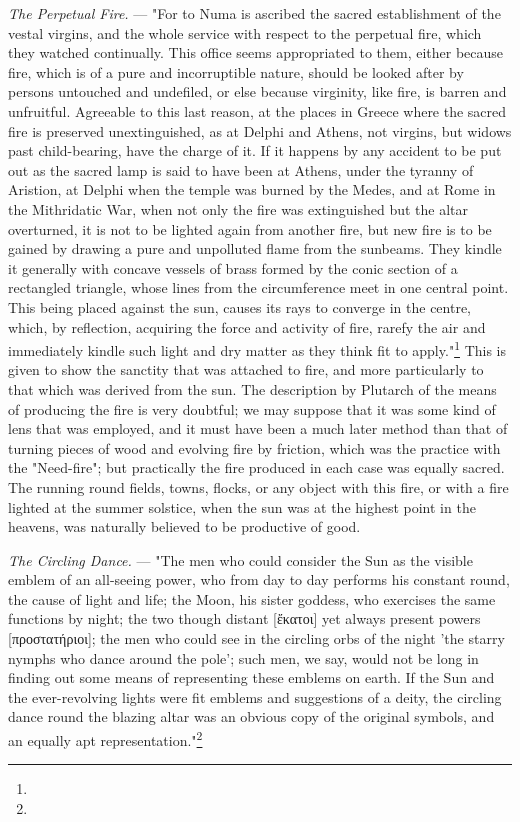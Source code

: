 \documentclass[a4paper, 11pt, oneside, polutonikogreek, english]{article}
\begin{document}
\emph{The Perpetual Fire.} --- "For to Numa is ascribed the sacred establishment of the vestal virgins, and the whole service with respect to the perpetual fire, which they watched continually. This office seems appropriated to them, either because fire, which is of a pure and incorruptible nature, should be looked after by persons untouched and undefiled, or else because virginity, like fire, is barren and unfruitful. Agreeable to this last reason, at the places in Greece where the sacred fire is preserved unextinguished, as at Delphi and Athens, not virgins, but widows past child-bearing, have the charge of it. If it happens by any accident to be put out as the sacred lamp is said to have been at Athens, under the tyranny of Aristion, at Delphi when the temple was burned by the Medes, and at Rome in the Mithridatic War, when not only the fire was extinguished but the altar overturned, it is not to be lighted again from another fire, but new fire is to be gained by drawing a pure and unpolluted flame from the sunbeams. They kindle it generally with concave vessels of brass formed by the conic section of a rectangled triangle, whose lines from the circumference meet in one central point. This being placed against the sun, causes its rays to converge in the centre, which, by reflection, acquiring the force and activity of fire, rarefy the air and immediately kindle such light and dry matter as they think fit to apply."\footnote{} This is given to show the sanctity that was attached to fire, and more particularly to that which was derived from the sun. The description by Plutarch of the means of producing the fire is very doubtful; we may suppose that it was some kind of lens that was employed, and it must have been a much later method than that of turning pieces of wood and evolving fire by friction, which was the practice with the "Need-fire"; but practically the fire produced in each case was equally sacred. The running round fields, towns, flocks, or any object with this fire, or with a fire lighted at the summer solstice, when the sun was at the highest point in the heavens, was naturally believed to be productive of good.

\emph{The Circling Dance.} --- "The men who could consider the Sun as the visible emblem of an all-seeing power, who from day to day performs his constant round, the cause of light and life; the Moon, his sister goddess, who exercises the same functions by night; the two though distant [ἔκατοι] yet always present powers [προστατήριοι]; the men who could see in the circling orbs of the night 'the starry nymphs who dance around the pole'; such men, we say, would not be long in finding out some means of representing these emblems on earth. If the Sun and the ever-revolving lights were fit emblems and suggestions of a deity, the circling dance round the blazing altar was an obvious copy of the original symbols, and an equally apt representation."\footnote{} 
\end{document}
